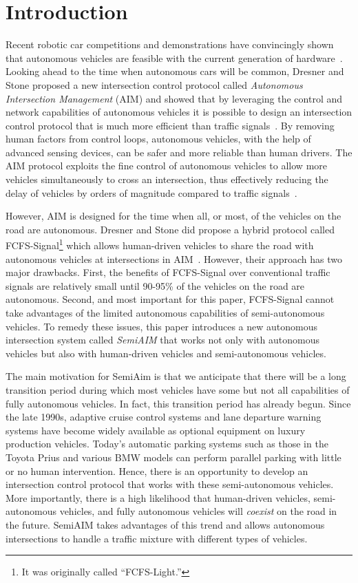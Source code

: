 \section{Introduction}

Recent robotic car competitions and demonstrations have convincingly
shown that autonomous vehicles are feasible with the current
generation of hardware~\cite{mybib:Darpa07Urban}. Looking ahead to the
time when autonomous cars will be common, Dresner and Stone proposed a
new intersection control protocol called \emph{Autonomous Intersection
  Management} (AIM) and showed that by leveraging the control and
network capabilities of autonomous vehicles it is possible to design
an intersection control protocol that is much more efficient than
traffic signals~\cite{bib:Dresner08Multiagent}.  By removing human
factors from control loops, autonomous vehicles, with the help of
advanced sensing devices, can be safer and more reliable than human
drivers.  The AIM protocol exploits the fine control of autonomous
vehicles to allow more vehicles simultaneously to cross an
intersection, thus effectively reducing the delay of vehicles by
orders of magnitude compared to traffic
signals~\cite{bib:Fajardo12Automated}.

However, AIM is designed for the time when all, or most, of the
vehicles on the road are autonomous.  Dresner and Stone did propose a
hybrid protocol called FCFS-Signal\footnote{It was originally called
  ``FCFS-Light.''} which allows human-driven vehicles to share the
road with autonomous vehicles at intersections in
AIM~\cite{bib:Dresner07Sharing}. However, their approach has two major
drawbacks.  First, the benefits of FCFS-Signal over conventional
traffic signals are relatively small until 90-95\% of the vehicles on
the road are autonomous.  Second, and most important for this paper,
FCFS-Signal cannot take advantages of the limited autonomous
capabilities of semi-autonomous vehicles.  To remedy these issues,
this paper introduces a new autonomous intersection system called
\emph{SemiAIM} that works not only with autonomous vehicles but also 
with human-driven vehicles and semi-autonomous vehicles.

The main motivation for SemiAim is that we anticipate that there will
be a long transition period during which most vehicles have some but
not all capabilities of fully autonomous vehicles.  In fact, this
transition period has already begun. Since the late 1990s, adaptive
cruise control systems and lane departure warning systems have become
widely available as optional equipment on luxury production vehicles.
Today's automatic parking systems such as those in the Toyota Prius
and various BMW models can perform parallel parking with little or no
human intervention.  Hence, there is an opportunity to develop an
intersection control protocol that works with these semi-autonomous
vehicles.  More importantly, there is a high likelihood that
human-driven vehicles, semi-autonomous vehicles, and fully
autonomous vehicles will \emph{coexist} on the road in the future.
SemiAIM takes advantages of this trend and allows autonomous
intersections to handle a traffic mixture with different types of
vehicles.

